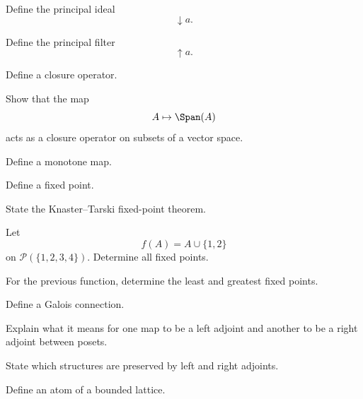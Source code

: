 \begin{exercise}[1]
Define the principal ideal
\[ \downarrow a. \]
\end{exercise}

\begin{exercise}[1]
Define the principal filter
\[ \uparrow a. \]
\end{exercise}

\begin{exercise}[1]
Define a closure operator.
\end{exercise}

\begin{exercise}[2]
Show that the map
\[ A\mapsto\Span(A) \]
acts as a closure operator on subsets of a vector space.
\end{exercise}

\begin{exercise}[1]
Define a monotone map.
\end{exercise}

\begin{exercise}[1]
Define a fixed point.
\end{exercise}

\begin{exercise}[2]
State the Knaster--Tarski fixed-point theorem.
\end{exercise}

\begin{exercise}[2]
Let
\[ f(A)=A\cup\{1,2\} \]
on \(\mathcal P(\{1,2,3,4\})\). Determine all fixed points.
\end{exercise}

\begin{exercise}[2]
For the previous function, determine the least and greatest fixed points.
\end{exercise}

\begin{exercise}[1]
Define a Galois connection.
\end{exercise}

\begin{exercise}[2]
Explain what it means for one map to be a left adjoint and another to be a
right adjoint between posets.
\end{exercise}

\begin{exercise}[2]
State which structures are preserved by left and right adjoints.
\end{exercise}

\begin{exercise}[1]
Define an atom of a bounded lattice.
\end{exercise}

